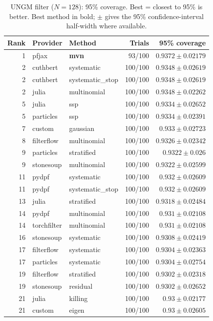 \begin{table}[!htbp]
\centering
\small
\caption{UNGM filter ($N=128$): 95\% coverage. Best = closest to 95\% is better. Best method in bold; $\pm$ gives the 95\% confidence-interval half-width where available.}
\label{tab:ungm-filter-coverage95}
\begin{tabular}{rllrr}
\toprule
Rank & Provider & Method & Trials & 95\% coverage \\
\midrule
1 & pfjax & \textbf{mvn} & 93/100 & $\mathbf{0.9372 \pm 0.02179}$ \\
2 & cuthbert & systematic & 100/100 & $0.9348 \pm 0.02619$ \\
2 & cuthbert & systematic\_stop & 100/100 & $0.9348 \pm 0.02619$ \\
2 & julia & multinomial & 100/100 & $0.9348 \pm 0.02262$ \\
5 & julia & ssp & 100/100 & $0.9334 \pm 0.02652$ \\
5 & particles & ssp & 100/100 & $0.9334 \pm 0.02391$ \\
7 & custom & gaussian & 100/100 & $0.933 \pm 0.02723$ \\
8 & filterflow & multinomial & 100/100 & $0.9326 \pm 0.02342$ \\
9 & particles & stratified & 100/100 & $0.9322 \pm 0.026$ \\
9 & stonesoup & multinomial & 100/100 & $0.9322 \pm 0.02599$ \\
11 & pydpf & systematic & 100/100 & $0.932 \pm 0.02609$ \\
11 & pydpf & systematic\_stop & 100/100 & $0.932 \pm 0.02609$ \\
13 & julia & stratified & 100/100 & $0.9318 \pm 0.02484$ \\
14 & pydpf & multinomial & 100/100 & $0.931 \pm 0.02108$ \\
14 & torchfilter & multinomial & 100/100 & $0.931 \pm 0.02108$ \\
16 & stonesoup & systematic & 100/100 & $0.9308 \pm 0.02419$ \\
17 & filterflow & systematic & 100/100 & $0.9304 \pm 0.02363$ \\
17 & particles & systematic & 100/100 & $0.9304 \pm 0.02754$ \\
19 & filterflow & stratified & 100/100 & $0.9302 \pm 0.02318$ \\
19 & stonesoup & residual & 100/100 & $0.9302 \pm 0.02652$ \\
21 & julia & killing & 100/100 & $0.93 \pm 0.02177$ \\
21 & custom & eigen & 100/100 & $0.93 \pm 0.02605$ \\

\end{tabular}
\end{table}
